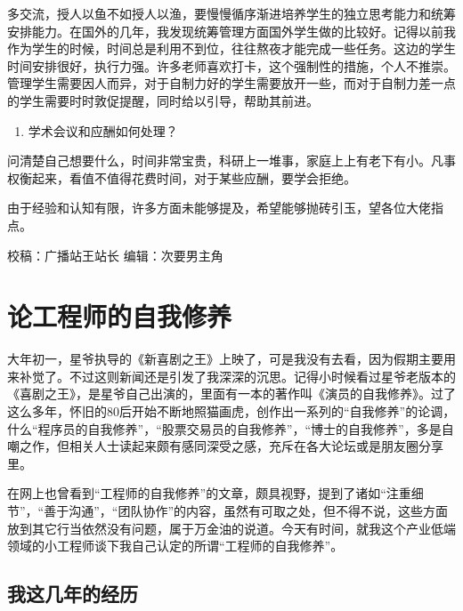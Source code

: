 \documentclass[
]{book}
\providecommand{\tightlist}{%
  \setlength{\itemsep}{0pt}\setlength{\parskip}{0pt}}
\begin{document}
多交流，授人以鱼不如授人以渔，要慢慢循序渐进培养学生的独立思考能力和统筹安排能力。在国外的几年，我发现统筹管理方面国外学生做的比较好。记得以前我作为学生的时候，时间总是利用不到位，往往熬夜才能完成一些任务。这边的学生时间安排很好，执行力强。许多老师喜欢打卡，这个强制性的措施，个人不推崇。管理学生需要因人而异，对于自制力好的学生需要放开一些，而对于自制力差一点的学生需要时时敦促提醒，同时给以引导，帮助其前进。

\begin{enumerate}
\def\labelenumi{\arabic{enumi}.}
\setcounter{enumi}{4}
\tightlist
\item
  学术会议和应酬如何处理？
\end{enumerate}

问清楚自己想要什么，时间非常宝贵，科研上一堆事，家庭上上有老下有小。凡事权衡起来，看值不值得花费时间，对于某些应酬，要学会拒绝。

由于经验和认知有限，许多方面未能够提及，希望能够抛砖引玉，望各位大佬指点。

校稿：广播站王站长
编辑：次要男主角

\hypertarget{ux8bbaux5de5ux7a0bux5e08ux7684ux81eaux6211ux4feeux517b}{%
\section{论工程师的自我修养}\label{ux8bbaux5de5ux7a0bux5e08ux7684ux81eaux6211ux4feeux517b}}

大年初一，星爷执导的《新喜剧之王》上映了，可是我没有去看，因为假期主要用来补觉了。不过这则新闻还是引发了我深深的沉思。记得小时候看过星爷老版本的《喜剧之王》，是星爷自己出演的，里面有一本的著作叫《演员的自我修养》。过了这么多年，怀旧的80后开始不断地照猫画虎，创作出一系列的``自我修养''的论调，什么``程序员的自我修养''，``股票交易员的自我修养''，``博士的自我修养''，多是自嘲之作，但相关人士读起来颇有感同深受之感，充斥在各大论坛或是朋友圈分享里。

在网上也曾看到``工程师的自我修养''的文章，颇具视野，提到了诸如``注重细节''，``善于沟通''，``团队协作''的内容，虽然有可取之处，但不得不说，这些方面放到其它行当依然没有问题，属于万金油的说道。今天有时间，就我这个产业低端领域的小工程师谈下我自己认定的所谓``工程师的自我修养''。

\hypertarget{ux6211ux8fd9ux51e0ux5e74ux7684ux7ecfux5386}{%
\subsection{我这几年的经历}\label{ux6211ux8fd9ux51e0ux5e74ux7684ux7ecfux5386}}
\end{document}
